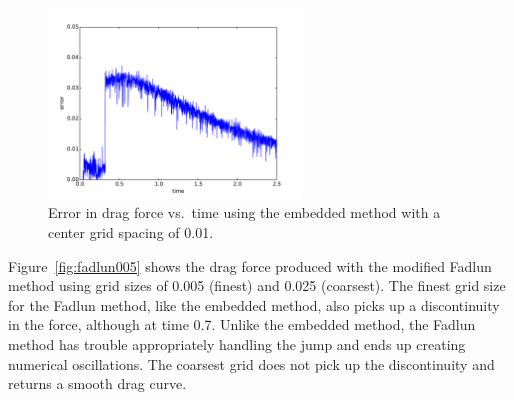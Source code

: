 \begin{figure}[!htb]
	\centering
	\includegraphics[width=0.6\textwidth]{embedded_error_01}
	\caption{Error in drag force vs.~time using the embedded method with a center grid spacing of 0.01.}
	\label{fig:embeddederror005}
\end{figure}

Figure~\ref{fig:fadlun005} shows the drag force produced with the modified Fadlun method using grid sizes of 0.005 (finest) and 0.025 (coarsest).
The finest grid size for the Fadlun method, like the embedded method, also picks up a discontinuity in the force, although at time 0.7.
Unlike the embedded method, the Fadlun method has trouble appropriately handling the jump and ends up creating numerical oscillations. 
The coarsest grid does not pick up the discontinuity and returns a smooth drag curve. 


